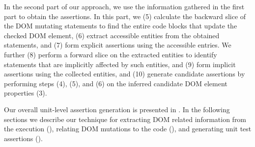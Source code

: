 In the second part of our approach, we use the information gathered in the first part to obtain the assertions. In this part, we
 (5) calculate the backward slice of the DOM mutating statements to find the entire code blocks that update the checked DOM element, (6) extract accessible entities from the obtained statements, and (7) form explicit assertions using the accessible entries. 
 We further (8) perform a forward slice on the extracted entities to identify statements that are implicitly affected by such entities, and (9) form implicit assertions using the collected entities, and (10) generate candidate assertions by performing steps (4), (5), and (6) on the inferred candidate DOM element properties (3).

Our overall unit-level assertion generation is presented in . In the following sections we describe our technique for extracting DOM related information from the execution (), relating
DOM mutations to the \javascript code (), and generating unit test assertions ().   


         
